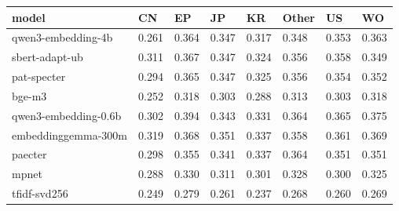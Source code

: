 \begin{tabular}{llllllll}
\toprule
model & CN & EP & JP & KR & Other & US & WO \\
\midrule
qwen3-embedding-4b & 0.261 & 0.364 & 0.347 & 0.317 & 0.348 & 0.353 & 0.363 \\
sbert-adapt-ub & 0.311 & 0.367 & 0.347 & 0.324 & 0.356 & 0.358 & 0.349 \\
pat-specter & 0.294 & 0.365 & 0.347 & 0.325 & 0.356 & 0.354 & 0.352 \\
bge-m3 & 0.252 & 0.318 & 0.303 & 0.288 & 0.313 & 0.303 & 0.318 \\
qwen3-embedding-0.6b & 0.302 & 0.394 & 0.343 & 0.331 & 0.364 & 0.365 & 0.375 \\
embeddinggemma-300m & 0.319 & 0.368 & 0.351 & 0.337 & 0.358 & 0.361 & 0.369 \\
paecter & 0.298 & 0.355 & 0.341 & 0.337 & 0.364 & 0.351 & 0.351 \\
mpnet & 0.288 & 0.330 & 0.311 & 0.301 & 0.328 & 0.300 & 0.325 \\
tfidf-svd256 & 0.249 & 0.279 & 0.261 & 0.237 & 0.268 & 0.260 & 0.269 \\
\bottomrule
\end{tabular}
